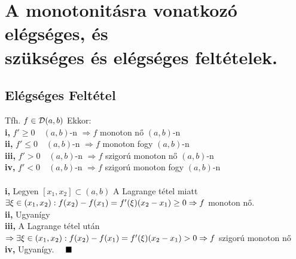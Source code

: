 \documentclass[a4paper,11pt]{article}
\begin{document}
\section{A monotonitásra vonatkozó elégséges, és \\ szükséges és elégséges feltételek.}
\subsection{Elégséges Feltétel}
\tetel Tfh. $f\in\displaystyle\mathcal{D}(a,b)$ Ekkor: \\[0.1cm]\hspace*{0.3cm}\textbf{i,} $f'\geq0\quad(a,b)$-n
$\Rightarrow f$ monoton nő $(a,b)$-n\\[0.1cm]\hspace*{0.3cm}\textbf{ii,}
$f'\leq0\quad(a,b)$-n $\Rightarrow f$ monoton fogy $(a,b)$-n\\[0.1cm]
\hspace*{0.3cm}\textbf{iii,} $f'>0\quad (a,b)$-n $\Rightarrow f$ szigorú monoton nő
$(a,b)$-n\\[0.1cm]\hspace*{0.3cm}\textbf{iv,} $f'<0\quad (a,b)$-n $\Rightarrow f$
szigorú monoton fogy $(a,b)$-n\\[0.2cm]\biz \\[0.1cm]\textbf{i,} Legyen
$[x_1,x_2]\subset(a,b)$ A Lagrange tétel miatt $\exists\xi\in
(x_1,x_2):\\[0.2cm]f(x_2)-f(x_1)=f'(\xi)(x_2-x_1)\geq0\Rightarrow f$ monoton
nő.\\[0.1cm]\textbf{ii,} Ugyanígy\\[0.1cm]\textbf{iii,} A Lagrange tétel után
$\Rightarrow\exists\xi\in (x_1,x_2):\\[0.2cm]f(x_2)-f(x_1)=f'(\xi)(x_2-x_1)>0
\Rightarrow f$ szigorú monoton nő\\[0.1cm]\textbf{iv,} Ugyanígy. $\quad\blacksquare$
\end{document}
